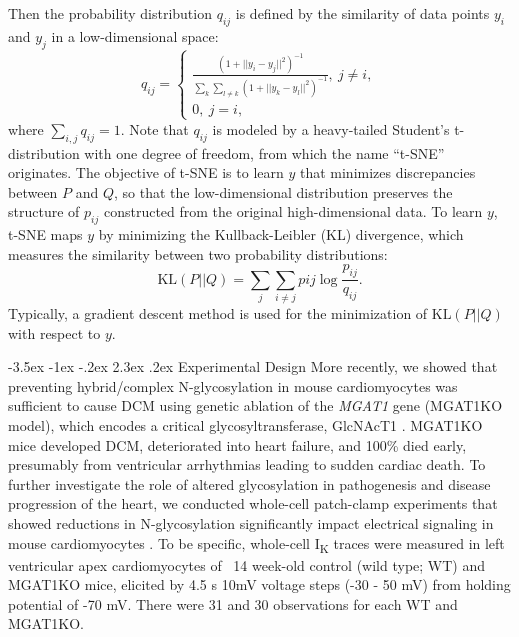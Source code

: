 \documentclass[11pt]{article}
\makeatletter
\renewcommand\section{\@startsection {section}{1}{\z@}%
                                   {-3.5ex \@plus -1ex \@minus -.2ex}%
                                   {2.3ex \@plus.2ex}%
                                   {\normalfont\fontfamily{phv}\fontsize{16}{19}\bfseries}}
\makeatother
\begin{document}
Then the probability distribution $q_{ij}$ is defined by the similarity of data points $y_i$ and $y_j$ in a low-dimensional space:
\begin{equation}
    q_{ij} = 
    \begin{cases}\frac{(1+||y_{i}-y_{j}||^{2})^{-1}}{\sum\limits_{k}\sum\limits_{l \neq k}(1+||y_{k}-y_{l}||^{2})^{-1}}, \ j \neq i, \\
    0, \ j=i,
    \end{cases}
\end{equation}
where $\sum\limits_{i,j}q_{ij}=1$. Note that $q_{ij}$ is modeled by a heavy-tailed Student's t-distribution with one degree of freedom, from which the name ``t-SNE'' originates. The objective of t-SNE is to learn $y$ that minimizes discrepancies between $P$ and $Q$, so that the low-dimensional distribution preserves the structure of $p_{ij}$ constructed from the original high-dimensional data. To learn $y$, t-SNE maps $y$ by minimizing the Kullback-Leibler (KL) divergence, which measures the similarity between two probability distributions:
\begin{equation}
    \mathrm{KL}(P||Q) = \sum\limits_{j}\sum\limits_{i \neq j}p{ij}\log \frac{p_{ij}}{q_{ij}}.
\end{equation}
Typically, a gradient descent method is used for the minimization of $\mathrm{KL}(P||Q)$ with respect to $y$.

\section{Experimental Design}
More recently, we showed that preventing hybrid/complex N-glycosylation in mouse cardiomyocytes was sufficient to cause DCM using genetic ablation of the \textit{MGAT1} gene (MGAT1KO model), which encodes a critical glycosyltransferase, GlcNAcT1 \citep{ednie2019reduced2}. MGAT1KO mice developed DCM, deteriorated into heart failure, and 100\% died early, presumably from ventricular arrhythmias leading to sudden cardiac death. To further investigate the role of altered glycosylation in pathogenesis and disease progression of the heart, we conducted whole-cell patch-clamp experiments that showed reductions in N-glycosylation significantly impact electrical signaling in mouse cardiomyocytes \citep{ednie2019reduced}. To be specific, whole-cell I\textsubscript{K} traces were measured in left ventricular apex cardiomyocytes of ~14 week-old control (wild type; WT) and MGAT1KO mice, elicited by 4.5 s 10mV voltage steps (-30 - 50 mV) from holding potential of -70 mV. There were 31 and 30 observations for each WT and MGAT1KO.
\end{document}
